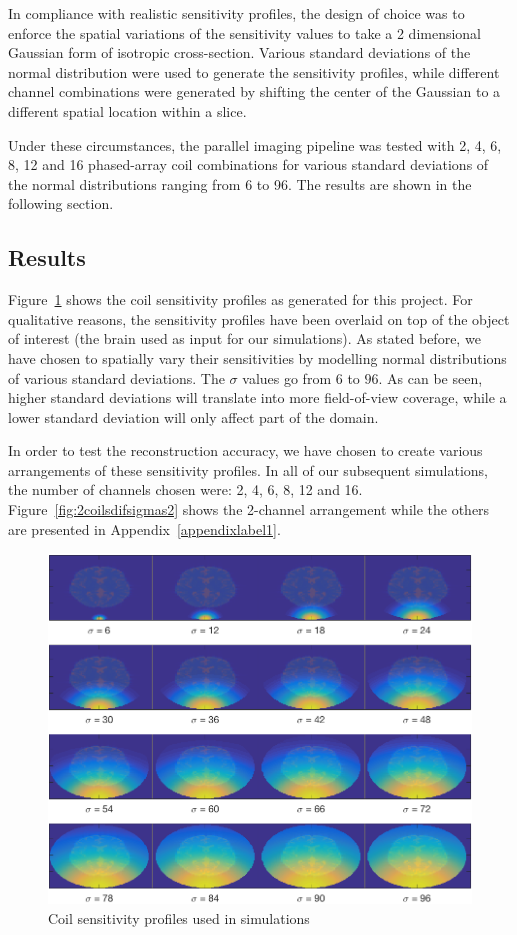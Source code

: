 In compliance with realistic sensitivity profiles, the design of choice was to enforce the spatial variations of the sensitivity values to take a 2 dimensional Gaussian form of isotropic cross-section. Various standard deviations of the normal distribution were used to generate the sensitivity profiles, while different channel combinations were generated by shifting the center of the Gaussian to a different spatial location within a slice. 

Under these circumstances, the parallel imaging pipeline was tested with 2, 4, 6, 8, 12 and 16 phased-array coil combinations for various standard deviations of the normal distributions ranging from 6 to 96. The results are shown in the following section.

\subsection{Results}
Figure~\ref{fig:1coildifsigmas2} shows the coil sensitivity profiles as generated for this project. For qualitative reasons, the sensitivity profiles have been overlaid on top of the object of interest (the brain used as input for our simulations). As stated before, we have chosen to spatially vary their sensitivities by modelling normal distributions of various standard deviations. The $\sigma$ values go from $6$ to $96$. As can be seen, higher standard deviations will translate into more field-of-view coverage, while a lower standard deviation will only affect part of the domain. 

In order to test the reconstruction accuracy, we have chosen to create various arrangements of these sensitivity profiles. In all of our subsequent simulations, the number of channels chosen were: 2, 4, 6, 8, 12 and 16. Figure~\ref{fig:2coilsdifsigmas2} shows the 2-channel arrangement while the others are presented in Appendix~\ref{appendixlabel1}.

\begin{figure}[H]
    \centering
    \includegraphics[width=.85\textwidth,keepaspectratio]{1coildifsigmas}
    \caption{Coil sensitivity profiles used in simulations}
    \label{fig:1coildifsigmas2}
\end{figure}


